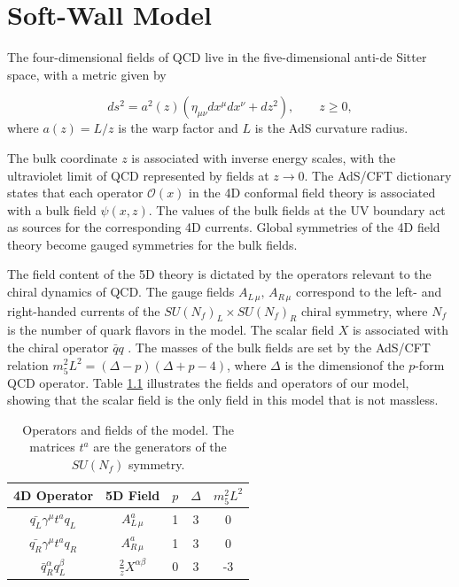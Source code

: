 \chapter{Soft-Wall Model\label{sec:Soft-Wall-Model}}

The four-dimensional fields of QCD live in the five-dimensional
anti-de Sitter space, with a metric given by

\begin{equation}
ds^{2}=a^{2}(z)(\eta_{\mu\nu}dx^{\mu}dx^{\nu}+dz^{2}),\qquad z\geq0,
\end{equation}
where $a(z)=L/z$ is the warp factor and $L$ is the AdS curvature
radius.

The bulk coordinate $z$ is associated with inverse energy scales, with the ultraviolet limit of QCD represented by fields at $z\rightarrow0$\cite{kwee-lebed-pion}. 
The AdS/CFT dictionary \cite{maldacena,klebanov-witten} states that each operator $\mathcal{O}(x)$ in the 4D conformal field theory is associated with a bulk field $\psi(x,z)$. 
The values of the bulk fields at the UV boundary act as sources for the corresponding
4D currents. 
Global symmetries of the 4D field theory become gauged symmetries for the bulk fields. 

The field content of the 5D theory is dictated by the operators relevant to the chiral dynamics of QCD. 
The gauge fields $A_{L\,\mu},\, A_{R\,\mu}$ correspond to the left- and right-handed currents of the $SU(N_{f})_{L}\times SU(N_{f})_{R}$ chiral symmetry, where $N_{f}$ is the number of quark flavors in
the model. 
The scalar field $X$ is associated with the chiral operator $\bar{q}q$ \cite{stephanov-katz-son}. 
The masses of the bulk fields are set by the AdS/CFT relation \cite{colangelo-light-scalar-mesons} $m_{5}^{2}L^{2}=(\Delta-p)(\Delta+p-4)$, where $\Delta$ is the dimensionof the $p$-form QCD operator. 
Table \ref{tab:Operators-and-fields} illustrates the fields and operators of our model, showing that the scalar field is the only field in this model that is not massless.

\begin{table}[htb]
\begin{center}
\begin{tabular}{|c|c|c|c|c|}
\hline 
4D Operator & 5D Field & $p$ & $\Delta$ & $m_{5}^{2}L^{2}$\\
\hline 
\hline 
$\bar{q_{L}}\gamma^{\mu}t^{a}q_{L}$ & $A_{L\,\mu}^{a}$ & 1 & 3 & 0\\
\hline 
$\bar{q_{R}}\gamma^{\mu}t^{a}q_{R}$ & $A_{R\,\mu}^{a}$ & 1 & 3 & 0\\
\hline 
$\bar{q}_{R}^{\alpha}q_{L}^{\beta}$ & $\frac{2}{z}X^{\alpha\beta}$ & 0 & 3 & -3\\
\hline 
\end{tabular}
\end{center}
\caption{Operators and fields of the model. The matrices $t^{a}$ are the generators of the $SU(N_{f})$ symmetry. 
\label{tab:Operators-and-fields}}
\end{table}

